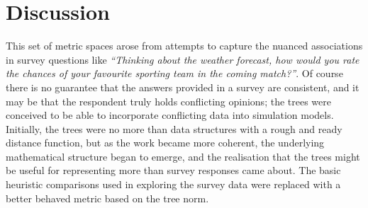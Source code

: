
  

    
 



\section{Discussion}

This set of metric spaces arose from attempts to capture the nuanced
associations in survey questions like \textsl{``Thinking about the
  weather forecast, how would you rate the chances of your favourite
  sporting team in the coming match?''\/}.  Of course there is no
guarantee that the answers provided in a survey are consistent, and it
may be that the respondent truly holds conflicting opinions; the trees
were conceived to be able to incorporate conflicting data into
simulation models. Initially, the trees were no more than data
structures with a rough and ready distance function, but as the
work became more coherent, the underlying mathematical structure began
to emerge, and the realisation that the trees might be useful for
representing more than survey responses came about. The basic
heuristic comparisons used in exploring the survey data were replaced
with a better behaved metric based on the tree norm.

